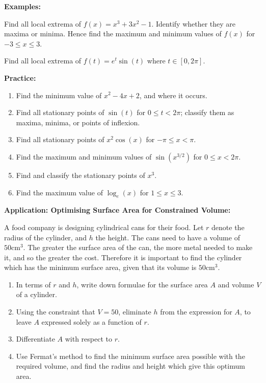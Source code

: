 \documentclass{article}
\begin{document}
\textbf{Examples:}\medskip

Find all local extrema of $f(x)=x^3+3x^2-1$. Identify whether they are maxima or minima. Hence find the maximum and minimum values of $f(x)$ for $-3\leq x\leq 3$.

\vfill

Find all local extrema of $f(t)=e^t\sin(t)$ where $t\in [0,2\pi]$.


\vfill



\clearpage



\textbf{Practice:}


\begin{enumerate}
	\item Find the minimum value of $x^2-4x+2$, and where it occurs.
	\item Find all stationary points of $\sin(t)$ for $0\leq t<2\pi$; classify them as maxima, minima, or points of inflexion.
	\item Find all stationary points of $x^2\cos(x)$ for $-\pi\leq x <\pi$.
	\item Find the maximum and minimum values of $\sin(x^{3/2})$ for $0\leq x<2\pi$.
	\item Find and classify the stationary points of $x^3$.
	\item Find the maximum value of $\log_e(x)$ for $1\leq x\leq 3$.
\end{enumerate}




\clearpage




\textbf{Application: Optimising Surface Area for Constrained Volume:}

\vspace{5mm}

A food company is designing cylindrical cans for their food. Let $r$ denote the radius of the cylinder, and $h$ the height. The cans need to have a volume of $50\mathrm{cm}^3$. The greater the surface area of the can, the more metal needed to make it, and so the greater the cost. Therefore it is important to find the cylinder which has the minimum surface area, given that its volume is $50\mathrm{cm}^3$.
\begin{enumerate}
	\item In terms of $r$ and $h$, write down formulae for the surface area $A$ and volume $V$ of a cylinder.
	\item Using the constraint that $V=50$, eliminate $h$ from the expression for $A$, to leave $A$ expressed solely as a function of $r$.
	\item Differentiate $A$ with respect to $r$.
	\item Use Fermat's method to find the minimum surface area possible with the required volume, and find the radius and height which give this optimum area.
\end{enumerate}
\end{document}
